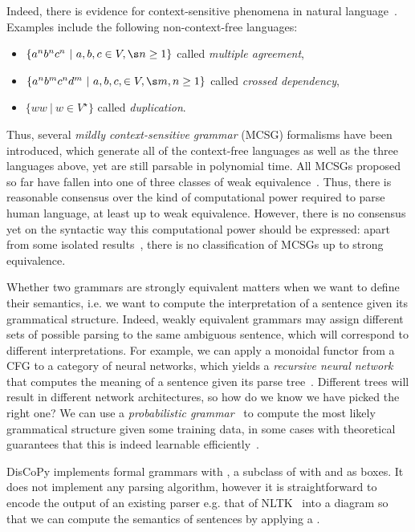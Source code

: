 Indeed, there is evidence for context-sensitive phenomena in natural language~\cite{Shieber87}.
Examples include the following non-context-free languages:
\begin{itemize}
  \item $\{ a^n b^n c^n \ \vert \ a, b, c \in V, \s n \geq 1 \}$ called \emph{multiple agreement},
  \item $\{ a^n b^m c^n d^m \ \vert \ a, b, c, \in V, \s m, n \geq 1 \}$ called \emph{crossed dependency},
  \item $\{ w w \ \vert \ w \in V^\star \}$ called \emph{duplication}.
\end{itemize}
Thus, several \emph{mildly context-sensitive grammar} (MCSG) formalisms have been introduced, which generate all of the context-free languages as well as the three languages above, yet are still parsable in polynomial time.
All MCSGs proposed so far have fallen into one of three classes of weak equivalence~\cite{Weir88}.
Thus, there is reasonable consensus over the kind of computational power required to parse human language, at least up to weak equivalence.
However, there is no consensus yet on the syntactic way this computational power should be expressed: apart from some isolated results~\cite{SchifferMaletti21}, there is no classification of MCSGs up to strong equivalence.

Whether two grammars are strongly equivalent matters when we want to define their semantics, i.e. we want to compute the interpretation of a sentence given its grammatical structure.
Indeed, weakly equivalent grammars may assign different sets of possible parsing to the same ambiguous sentence, which will correspond to different interpretations.
For example, we can apply a monoidal functor from a CFG to a category of neural networks, which yields a \emph{recursive neural network} that computes the meaning of a sentence given its parse tree~\cite{SocherEtAl11,SocherEtAl13}.
Different trees will result in different network architectures, so how do we know we have picked the right one?
We can use a \emph{probabilistic grammar}~\cite{Salomaa69} to compute the most likely grammatical structure given some training data, in some cases with theoretical guarantees that this is indeed learnable efficiently~\cite{ClarkEtAl06,ShibataYoshinaka16}.

DisCoPy implements formal grammars with , a subclass of  with  and  as boxes.
It does not implement any parsing algorithm, however it is straightforward to encode the output of an existing parser e.g. that of NLTK~\cite{LoperBird02} into a  diagram so that we can compute the semantics of sentences by applying a .

